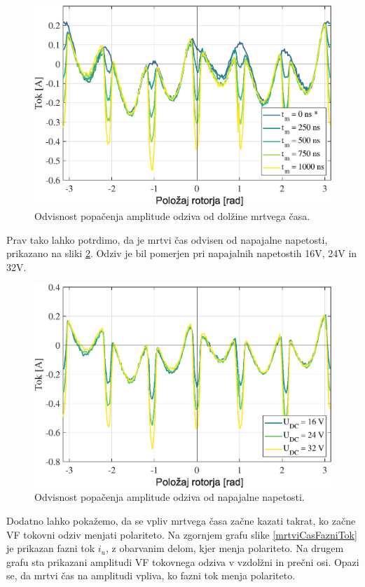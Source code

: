 \documentclass[a4paper,twoside,openright,12pt,slovene]{book}
\begin{document}
\begin{figure}[!htbp]
    \centering
    \includegraphics[width=0.8\columnwidth]{Slike/mrtviCas.eps}
    \caption{\label{mrtviCas} Odvisnost popačenja amplitude odziva od dolžine mrtvega časa. }
\end{figure}

Prav tako lahko potrdimo, da je mrtvi čas odvisen od napajalne napetosti, prikazano na sliki \ref{mrtviCasNapetost}. Odziv je bil pomerjen pri napajalnih napetostih 16V, 24V in 32V.
\renewcommand*{\thefootnote}{\fnsymbol{footnote}}
\begin{figure}[!htbp]
    \centering
    \includegraphics[width=0.8\columnwidth]{Slike/mrtviCasNapetost.eps}
    \caption{\label{mrtviCasNapetost} Odvisnost popačenja amplitude odziva od napajalne napetosti. }
\end{figure}


\newpage
Dodatno lahko pokažemo, da se vpliv mrtvega časa začne kazati takrat, ko začne VF tokovni odziv menjati polariteto. Na zgornjem grafu slike \ref{mrtviCasFazniTok} je prikazan fazni tok $i_u$, z
obarvanim delom, kjer menja polariteto. Na drugem grafu sta prikazani amplitudi VF tokovnega odziva v vzdolžni in prečni osi. Opazi se, da mrtvi čas na amplitudi vpliva, ko fazni tok menja polariteto.
\end{document}

